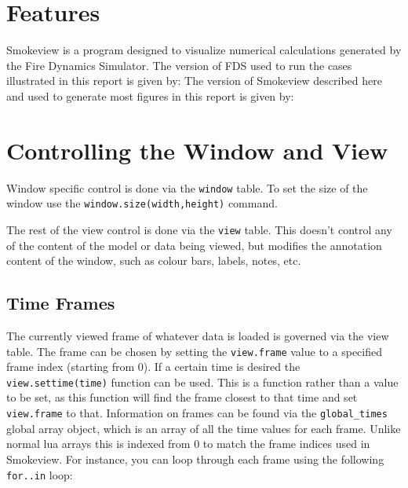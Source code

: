 \documentclass[11pt,twoside]{book}
\begin{document}

\section{Features}

Smokeview is a program designed to visualize numerical
calculations generated by the Fire Dynamics Simulator.
The version of FDS used to run the cases illustrated  in this report
is given by:
% 
The version of Smokeview described here and used
to generate most figures in this report is given by:
% 

\section{Controlling the Window and View}

Window specific control is done via the \verb|window| table. To set the size
of the window use the \lstinline{window.size(width,height)} command.

The rest of the view control is done via the \lstinline{view} table. This
doesn't control any of the content of the model or data being viewed, but
modifies the annotation content of the window, such as colour bars, labels,
notes, etc.

\subsection{Time Frames}

The currently viewed frame of whatever data is loaded is governed via the view
table. The frame can be chosen by setting the \lstinline{view.frame} value to a
specified frame index (starting from 0). If a certain time is desired the
\lstinline{view.settime(time)} function can be used. This is a function rather
than a value to be set, as this function will find the frame closest to that
time and set \lstinline{view.frame} to that. Information on frames can be found
via the \lstinline{global_times} global array object, which is an array of all
the time values for each frame. Unlike normal lua arrays this is indexed from 0
to match the frame indices used in Smokeview. For instance, you can loop through
each frame using the following \lstinline{for..in} loop:
\end{document}
